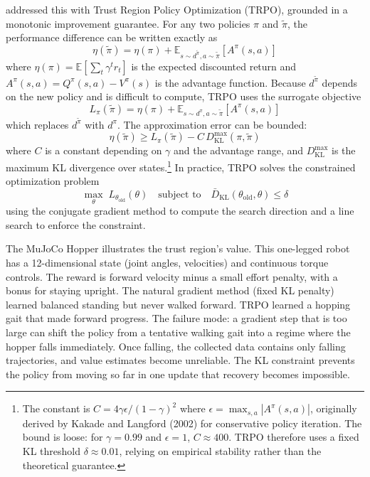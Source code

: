 \citet{Schulman2015} addressed this with Trust Region Policy Optimization (TRPO), grounded in a monotonic improvement guarantee. For any two policies $\pi$ and $\tilde{\pi}$, the performance difference can be written exactly as
\begin{equation}
\eta(\tilde{\pi}) = \eta(\pi) + \mathbb{E}_{s \sim d^{\tilde{\pi}}, a \sim \tilde{\pi}} \left[ A^\pi(s,a) \right]
\end{equation}
where $\eta(\pi) = \mathbb{E}[\sum_t \gamma^t r_t]$ is the expected discounted return and $A^\pi(s,a) = Q^\pi(s,a) - V^\pi(s)$ is the advantage function. Because $d^{\tilde{\pi}}$ depends on the new policy and is difficult to compute, TRPO uses the surrogate objective
\begin{equation}
L_\pi(\tilde{\pi}) = \eta(\pi) + \mathbb{E}_{s \sim d^\pi, a \sim \tilde{\pi}} \left[ A^\pi(s,a) \right]
\end{equation}
which replaces $d^{\tilde{\pi}}$ with $d^\pi$. The approximation error can be bounded:
\begin{equation}
\eta(\tilde{\pi}) \geq L_\pi(\tilde{\pi}) - C \, D_{\mathrm{KL}}^{\max}(\pi, \tilde{\pi})
\end{equation}
where $C$ is a constant depending on $\gamma$ and the advantage range, and $D_{\mathrm{KL}}^{\max}$ is the maximum KL divergence over states.\footnote{The constant is $C = 4\gamma\epsilon / (1-\gamma)^2$ where $\epsilon = \max_{s,a} |A^\pi(s,a)|$, originally derived by Kakade and Langford (2002) for conservative policy iteration. The bound is loose: for $\gamma = 0.99$ and $\epsilon = 1$, $C \approx 400$. TRPO therefore uses a fixed KL threshold $\delta \approx 0.01$, relying on empirical stability rather than the theoretical guarantee.} In practice, TRPO solves the constrained optimization problem
\begin{equation}
\max_\theta \; L_{\theta_{\text{old}}}(\theta) \quad \text{subject to} \quad \bar{D}_{\mathrm{KL}}(\theta_{\text{old}}, \theta) \leq \delta
\end{equation}
using the conjugate gradient method to compute the search direction and a line search to enforce the constraint.

The MuJoCo Hopper illustrates the trust region's value. This one-legged robot has a 12-dimensional state (joint angles, velocities) and continuous torque controls. The reward is forward velocity minus a small effort penalty, with a bonus for staying upright. The natural gradient method (fixed KL penalty) learned balanced standing but never walked forward. TRPO learned a hopping gait that made forward progress. The failure mode: a gradient step that is too large can shift the policy from a tentative walking gait into a regime where the hopper falls immediately. Once falling, the collected data contains only falling trajectories, and value estimates become unreliable. The KL constraint prevents the policy from moving so far in one update that recovery becomes impossible.

